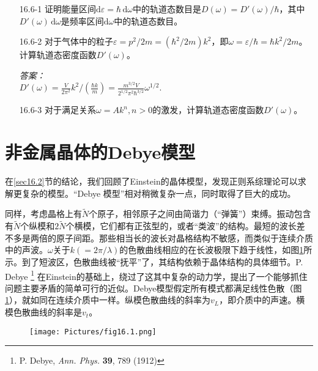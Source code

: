 \begin{itemize}
\item[16.6-1] 证明能量区间$\mathrm d\varepsilon=\hbar\,\mathrm d\omega$中的轨道态数目是$D(\omega)=D'(\omega)/\hbar$，其中$D'(\omega)\,\mathrm d\omega$是频率区间$\mathrm d\omega$中的轨道态数目。
\item[16.6-2] 对于气体中的粒子$\varepsilon=p^2/2m=(\hbar^2/2m)k^2$，即$\omega=\varepsilon/\hbar=\hbar k^2/2m$。计算轨道态密度函数$D'(\omega)$。
\begin{flushright}
{\it 答案：}\\
$D'(\omega)=\frac{V}{2\pi^2}k^2/\left(\frac{\hbar k}{m}\right)=\frac{m^{3/2}V}{2^{1/2}\pi^2\hbar^{3/2}}\omega^{1/2}.$
\end{flushright}
\item[16.6-3] 对于满足关系$\omega=Ak^n,n>0$的激发，计算轨道态密度函数$D'(\omega)$。
\end{itemize}
\section{非金属晶体的Debye模型}\label{sec16.7}
在\ref{sec16.2}节的结论，我们回顾了Einstein的晶体模型，发现正则系综理论可以求解更复杂的模型。``Debye 模型''相对稍微复杂一点，同时取得了巨大的成功。

同样，考虑晶格上有$\tilde N$个原子，相邻原子之间由简谐力（``弹簧''）束缚。振动包含有$\tilde N$个纵模和$2\tilde N$个横模，它们都有正弦型的，或者``类波''的结构。最短的波长差不多是两倍的原子间距。那些相当长的波长对晶格结构不敏感，而类似于连续介质中的声波。$\omega$关于$k(=2\pi/\lambda)$的色散曲线相应的在长波极限下趋于线性，如图\ref{fig16.1}所示。到了短波区，色散曲线被``抚平''了，其结构依赖于晶体结构的具体细节。P. Debye%
\footnote{P. Debye, {\it Ann. Phys.} {\bf 39}, 789 (1912)}%
在Einstein的基础上，绕过了这其中复杂的动力学，提出了一个能够抓住问题主要矛盾的简单可行的近似。Debye模型假定所有模式都满足线性色散（图\ref{fig16.1}），就如同在连续介质中一样。纵模色散曲线的斜率为$v_L$，即介质中的声速。横模色散曲线的斜率是$v_t$。

\begin{figure}
\centering
\texttt{[image: Pictures/fig16.1.png]}
\label{fig16.1}
\end{figure}

